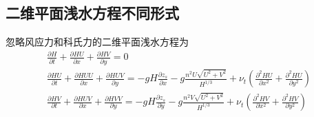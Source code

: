                                                         \subsection{二维平面浅水方程不同形式}
                                                        忽略风应力和科氏力的二维平面浅水方程为
                                                        \begin{equation}
                                                          \begin{gathered}
                                                            \frac{\partial H}{\partial t} +
                                                            \frac{\partial HU}{\partial x} +
                                                            \frac{\partial HV}{\partial y}
                                                            =
                                                            0
                                                            \\
                                                            \frac{\partial HU}{\partial t} +
                                                            \frac{\partial HUU}{\partial x} +
                                                            \frac{\partial HUV}{\partial y}
                                                            =
                                                            -gH\frac{\partial  z_{s}}{\partial x}
                                                            -g\frac{n^{2}U\sqrt{U^{2}+V^{2}}}{H^{1/3}}
                                                            +
                                                            \nu_{t}\left(
                                                              \frac{\partial^{2}HU}{\partial x^{2}}+
                                                              \frac{\partial^{2}HU}{\partial y^{2}}
                                                            \right)
                                                            \\
                                                            \frac{\partial HV}{\partial t} +
                                                            \frac{\partial HUV}{\partial x} +
                                                            \frac{\partial HVV}{\partial y}
                                                            =
                                                            -gH\frac{\partial  z_{s}}{\partial y}
                                                            -g\frac{n^{2}V\sqrt{U^{2}+V^{2}}}{H^{1/3}}
                                                            +
                                                            \nu_{t}\left(
                                                              \frac{\partial^{2}HV}{\partial x^{2}}+
                                                              \frac{\partial^{2}HV}{\partial y^{2}}
                                                            \right)
                                                          \end{gathered}
                                                        \end{equation}

